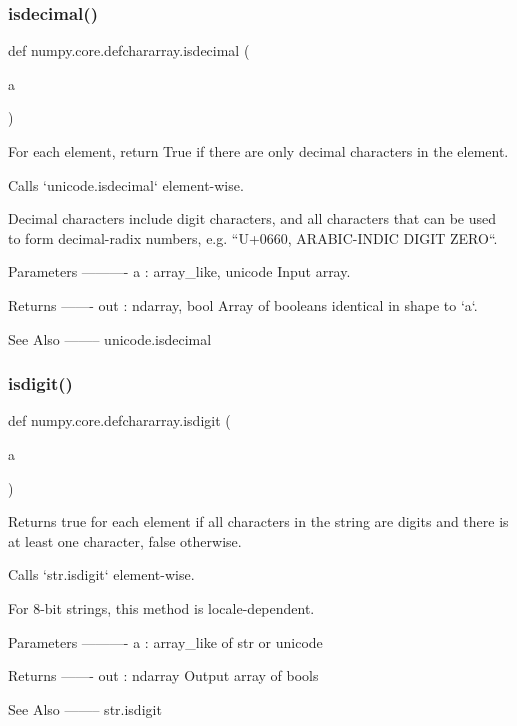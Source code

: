 \subsubsection{\texorpdfstring{isdecimal()}{isdecimal()}}
{\footnotesize\ttfamily def numpy.\+core.\+defchararray.\+isdecimal (\begin{DoxyParamCaption}\item[{}]{a }\end{DoxyParamCaption})}

\begin{DoxyVerb}For each element, return True if there are only decimal
characters in the element.

Calls `unicode.isdecimal` element-wise.

Decimal characters include digit characters, and all characters
that can be used to form decimal-radix numbers,
e.g. ``U+0660, ARABIC-INDIC DIGIT ZERO``.

Parameters
----------
a : array_like, unicode
    Input array.

Returns
-------
out : ndarray, bool
    Array of booleans identical in shape to `a`.

See Also
--------
unicode.isdecimal\end{DoxyVerb}
 \mbox{\label{namespacenumpy_1_1core_1_1defchararray_ac64ff22a93452d51136aa417638691b6}} 
\subsubsection{\texorpdfstring{isdigit()}{isdigit()}}
{\footnotesize\ttfamily def numpy.\+core.\+defchararray.\+isdigit (\begin{DoxyParamCaption}\item[{}]{a }\end{DoxyParamCaption})}

\begin{DoxyVerb}Returns true for each element if all characters in the string are
digits and there is at least one character, false otherwise.

Calls `str.isdigit` element-wise.

For 8-bit strings, this method is locale-dependent.

Parameters
----------
a : array_like of str or unicode

Returns
-------
out : ndarray
    Output array of bools

See Also
--------
str.isdigit
\end{DoxyVerb}
 \mbox{\label{namespacenumpy_1_1core_1_1defchararray_a8674bd9ad266f9bfff4226e6c1634807}} 
